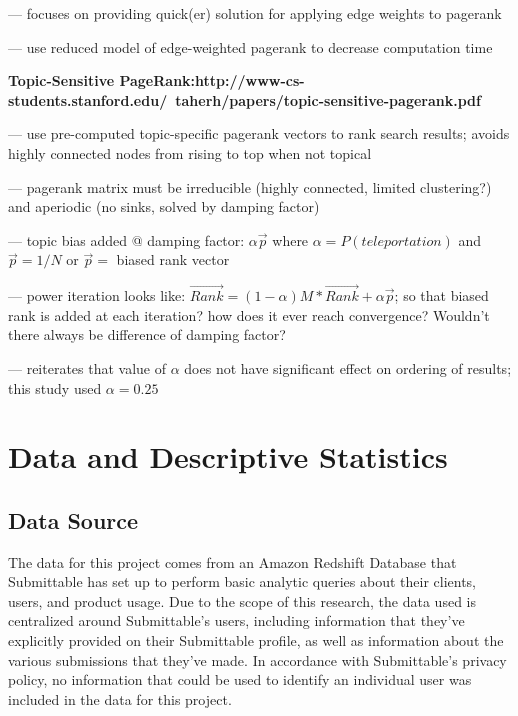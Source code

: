 \documentclass[]{report}   %
\begin{document}
--- focuses on providing quick(er) solution for applying edge weights to pagerank

--- use reduced model of edge-weighted pagerank to decrease computation time

\textbf{Topic-Sensitive PageRank:http://www-cs-students.stanford.edu/~taherh/papers/topic-sensitive-pagerank.pdf}

--- use pre-computed topic-specific pagerank vectors to rank search results; avoids highly connected nodes from rising to top when not topical

--- pagerank matrix must be irreducible (highly connected, limited clustering?) and aperiodic (no sinks, solved by damping factor)

--- topic bias added @ damping factor: $\alpha \vec{p}$ where $\alpha = P(teleportation)$ and $\vec{p} = 1/N$ or $\vec{p} =$ biased rank vector

--- power iteration looks like: $\vec{Rank} = (1- \alpha )M * \vec{Rank} + \alpha \vec{p}$; so that biased rank is added at each iteration? how does it ever reach convergence? Wouldn't there always be difference of damping factor?

--- reiterates that value of $\alpha$ does not have significant effect on ordering of results; this study used $\alpha = 0.25$


\chapter{Data and Descriptive Statistics}         
\section{Data Source}
The data for this project comes from an Amazon Redshift Database that Submittable has set up to perform basic analytic queries about their clients, users, and product usage. Due to the scope of this research, the data used is centralized around Submittable's users, including information that they've explicitly provided on their Submittable profile, as well as information about the various submissions that they've made. In accordance with Submittable's privacy policy, no information that could be used to identify an individual user was included in the data for this project.
\end{document}
